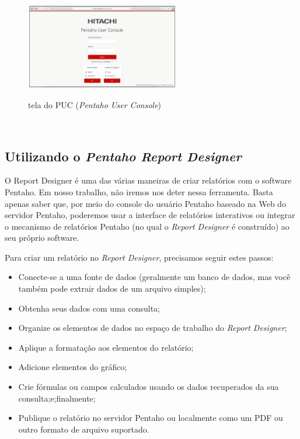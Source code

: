 \begin{figure}[H]
	\vspace*{0,2cm}
    \centering
    \caption{tela do PUC (\textit{Pentaho User Console})}
    \includegraphics[width=0.6\textwidth]{./04-figuras/figura-puc}
    \label{fig:ilustfigpuc}
\end{figure}
\vspace*{-0,9cm}
{\raggedright {}} \\


\subsection{Utilizando o \textit{Pentaho Report Designer}}

O Report Designer \'{e} uma das v\'{a}rias maneiras de criar relat\'orios com o software Pentaho. Em nosso trabalho, n\~{a}o iremos nos deter nessa ferramenta. Basta apenas saber que, por meio do console do usu\'{a}rio Pentaho baseado na Web do servidor Pentaho, poderemos usar a interface de relat\'orios interativos ou integrar o mecanismo de relat\'orios Pentaho (no qual o \textit{Report Designer} \'{e} construído) ao seu pr\'oprio software.

Para criar um relat\'orio no \textit{Report Designer}, precisamos seguir estes passos:

\begin{itemize}
    \item Conecte-se a uma fonte de dados (geralmente um banco de dados, mas você tamb\'{e}m pode extrair dados de um arquivo simples);
    \item Obtenha seus dados com uma consulta;
    \item Organize os elementos de dados no espa\c{c}o de trabalho do \textit{Report Designer};
    \item Aplique a formata\c{c}\~{a}o aos elementos do relat\'orio;
    \item Adicione elementos do gr\'{a}fico;
    \item Crie f\'ormulas ou campos calculados usando os dados recuperados da sua consulta;e;finalmente;
    \item Publique o relat\'orio no servidor Pentaho ou localmente como um PDF ou outro formato de arquivo suportado. 
\end{itemize}

